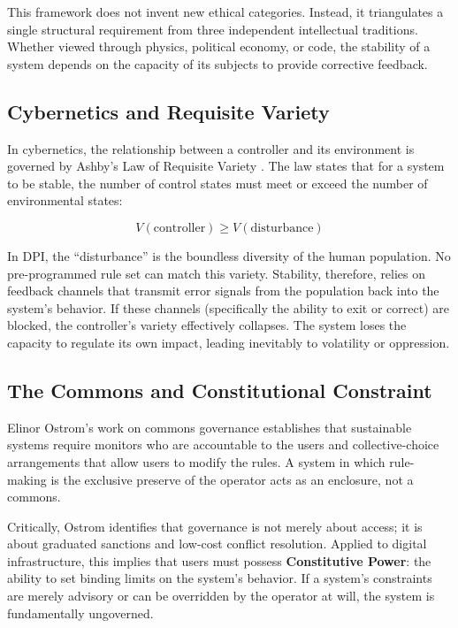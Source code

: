 \documentclass{article}
\begin{document}
This framework does not invent new ethical categories. Instead, it triangulates a single structural requirement from three independent intellectual traditions. Whether viewed through physics, political economy, or code, the stability of a system depends on the capacity of its subjects to provide corrective feedback.

\subsection{Cybernetics and Requisite Variety}

In cybernetics, the relationship between a controller and its environment is governed by Ashby's Law of Requisite Variety \citep{ashby1956}. The law states that for a system to be stable, the number of control states must meet or exceed the number of environmental states:

\begin{equation}
V(\text{controller}) \geq V(\text{disturbance})
\end{equation}

In DPI, the ``disturbance'' is the boundless diversity of the human population. No pre-programmed rule set can match this variety. Stability, therefore, relies on feedback channels that transmit error signals from the population back into the system's behavior. If these channels (specifically the ability to exit or correct) are blocked, the controller's variety effectively collapses. The system loses the capacity to regulate its own impact, leading inevitably to volatility or oppression.

\subsection{The Commons and Constitutional Constraint}

Elinor Ostrom's work on commons governance \citep{ostrom1990} establishes that sustainable systems require monitors who are accountable to the users and collective-choice arrangements that allow users to modify the rules. A system in which rule-making is the exclusive preserve of the operator acts as an enclosure, not a commons.

Critically, Ostrom identifies that governance is not merely about access; it is about graduated sanctions and low-cost conflict resolution. Applied to digital infrastructure, this implies that users must possess \textbf{Constitutive Power}: the ability to set binding limits on the system's behavior. If a system's constraints are merely advisory or can be overridden by the operator at will, the system is fundamentally ungoverned.
\end{document}
